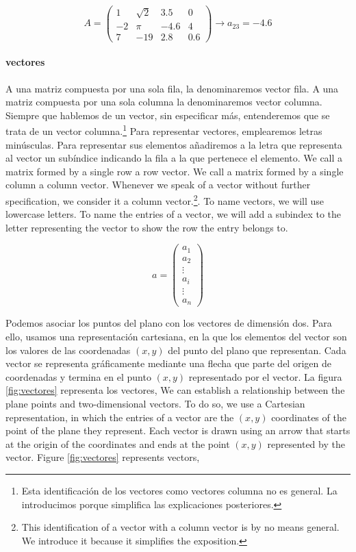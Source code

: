 \begin{equation*}
A=
\begin{pmatrix}
1& \sqrt{2}& 3.5& 0\\
-2& \pi& -4.6& 4\\
7& -19& 2.8& 0.6
\end{pmatrix}
\rightarrow a_{23}=-4.6
\end{equation*}
\begin{paracol}{2}
\paragraph{vectores}
A una matriz compuesta por una sola fila, la denominaremos vector fila. A una matriz compuesta por una sola columna la denominaremos vector columna. Siempre que hablemos de un vector, sin especificar más, entenderemos que se trata de un vector columna.\footnote{Esta identificación de los vectores como vectores columna no es general. La introducimos porque simplifica las explicaciones posteriores.} Para representar vectores, emplearemos letras minúsculas. Para representar sus elementos añadiremos a la letra que representa al vector un subíndice indicando la fila a la que pertenece el elemento.
\switchcolumn
We call a matrix formed by a single row a row vector. We call a matrix formed by a single column a column vector. Whenever we speak of a vector without further specification, we consider it a column vector.\footnote{This identification of a vector with a column vector is by no means general. We introduce it because it simplifies the exposition.}. To name vectors, we will use lowercase letters. To name the entries of a vector, we will add a subindex to the letter representing the vector to show the row the entry belongs to. 
\end{paracol}
\begin{equation*}
a=
\begin{pmatrix}
a_1\\
a_2\\
\vdots \\
a_i\\
\vdots \\
a_n
\end{pmatrix}
\end{equation*}
\begin{paracol}{2}
Podemos asociar los puntos del plano con los vectores de dimensión dos. Para ello, usamos una representación cartesiana, en la que los elementos del vector son los valores de las coordenadas $(x,y)$ del punto del plano que representan. Cada vector se representa gráficamente mediante una flecha que parte del origen de coordenadas y termina en el punto $(x,y)$ representado por el vector. La figura \ref{fig:vectores} representa los vectores,
\switchcolumn
We can establish a relationship between the plane points and two-dimensional vectors. To do so, we use a Cartesian representation, in which the entries of a vector are the $(x,y)$ coordinates of the point of the plane they represent. Each vector is drawn using an arrow that starts at the origin of the coordinates and ends at the point $(x,y)$ represented by the vector. Figure \ref{fig:vectores} represents vectors, 
\end{paracol}
